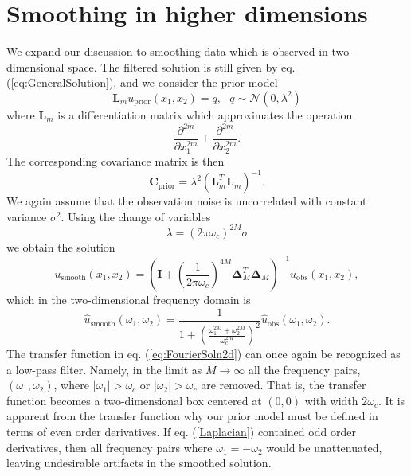 \documentclass[10pt,a4paper]{article}
\begin{document}
\section*{Smoothing in higher dimensions} 
We expand our discussion to smoothing data which is observed in two-dimensional space.  The filtered solution is still given by eq. (\ref{eq:GeneralSolution}), and we consider the prior model
\begin{equation}
  \mathbf{L}_m u_\mathrm{prior}(x_1,x_2) = q, \ \ \ q \sim \mathcal{N}(0,\lambda^2)
\end{equation}  
where $\mathbf{L}_m$ is a differentiation matrix which approximates the operation 
\begin{equation}\label{Laplacian}
  \frac{\partial^{2m}}{\partial x_1^{2m}} +
  \frac{\partial^{2m}}{\partial x_2^{2m}}.
\end{equation} 
The corresponding covariance matrix is then
\begin{equation}\label{Covariance2D}
\mathbf{C}_\mathrm{prior} = \lambda^2\left(\mathbf{L}_m^T\mathbf{L}_m\right)^{-1}. 
\end{equation}           
We again assume that the observation noise is uncorrelated with constant variance $\sigma^2$.  Using the change of variables
\begin{equation}
\lambda = (2\pi\omega_c)^{2M}\sigma
\end{equation}
we obtain the solution
\begin{equation}\label{eq:TimeSoln2d}
u_\mathrm{smooth}(x_1,x_2) = \left(\mathbf{I} + 
                          \left(\frac{1}{2\pi\omega_c}\right)^{4M}
                          \mathbf{\Delta}_M^T\mathbf{\Delta}_M\right)^{-1}
                          u_\mathrm{obs}(x_1,x_2),
\end{equation}
which in the two-dimensional frequency domain is
\begin{equation}\label{eq:FourierSoln2d}
\hat{u}_\mathrm{smooth}(\omega_1,\omega_2) = \frac{1}{1 + \left(\frac{\omega_1^{2M} + \omega_2^{2M}}
                                                  {\omega_c^{2M}}\right)^2}
                                             \hat{u}_\mathrm{obs}(\omega_1,\omega_2).
\end{equation}
The transfer function in eq. (\ref{eq:FourierSoln2d}) can once again be recognized as a low-pass filter.  Namely, in the limit as $M \to \infty$ all the frequency pairs, $(\omega_1,\omega_2)$, where $|\omega_1| > \omega_c$ or $|\omega_2| > \omega_c$ are removed.  That is, the transfer function becomes a two-dimensional box centered at $(0,0)$ with width $2\omega_c$.  It is apparent from the transfer function why our prior model must be defined in terms of even order derivatives.  If eq. (\ref{Laplacian}) contained odd order derivatives, then all frequency pairs where $\omega_1=-\omega_2$ would be unattenuated, leaving undesirable artifacts in the smoothed solution.
\end{document}
